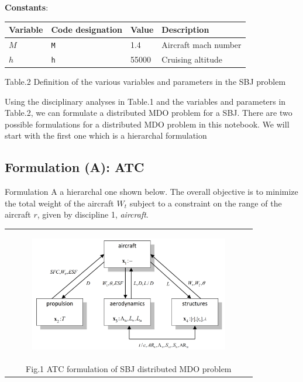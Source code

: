 \documentclass[11pt]{article}
\begin{document}
\textbf{Constants}:

\begin{longtable}[]{@{}llll@{}}
\toprule
Variable & Code designation & Value & Description\tabularnewline
\midrule
\endhead
\(M\) & \texttt{M} & 1.4 & Aircraft mach number\tabularnewline
\(h\) & \texttt{h} & 55000 & Cruising altitude\tabularnewline
\bottomrule
\end{longtable}

Table.2 Definition of the various variables and parameters in the SBJ
problem

Using the disciplinary analyses in Table.1 and the variables and
parameters in Table.2, we can formulate a distributed MDO problem for a
SBJ. There are two possible formulations for a distributed MDO problem
in this notebook. We will start with the first one which is a hierarchal
formulation

    \hypertarget{formulation-a-atc}{%
\subsection{Formulation (A): ATC}\label{formulation-a-atc}}

Formulation A a hierarchal one shown below. The overall objective is to
minimize the total weight of the aircraft \(W_t\) subject to a
constraint on the range of the aircraft \(r\), given by discipline 1,
\emph{aircraft}.

\begin{longtable}[]{@{}c@{}}
    \toprule
    \endhead
    \begin{minipage}[t]{0.97\columnwidth}\centering
        \begin{figure}
            \centering
            \includegraphics[height=5cm]{images/SBJ_schematics_001.png}
        \end{figure}\strut
    \end{minipage}\tabularnewline
    \begin{minipage}[t]{0.97\columnwidth}\centering
        Fig.1 ATC formulation of SBJ distributed MDO problem\strut
    \end{minipage}\tabularnewline
    \bottomrule
\end{longtable}
\end{document}
